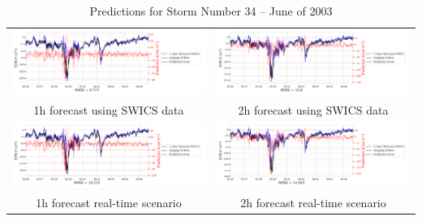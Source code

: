 \documentclass[draft,sw]{agutexSI2019}
\begin{document}
\begin{table}
\centering
\begin{tabular}{cc}
\includegraphics[width=0.49\linewidth]{paper_plots_shade/1h_swics/1h_swics_storm_34.png}
&
\includegraphics[width=0.49\linewidth]{paper_plots_shade/2h_swics/2h_swics_storm_34.png}
\\
1h forecast using SWICS data & 2h forecast using SWICS data
\vspace*{12pt}
\\
\includegraphics[width=0.49\linewidth]{paper_plots_shade/1h_rt/1h_rt_storm_34.png}
&
\includegraphics[width=0.49\linewidth]{paper_plots_shade/2h_rt/2h_rt_storm_34.png}
\\
1h forecast real-time scenario & 2h forecast real-time scenario 
\vspace*{12pt}
\\
\end{tabular}
\caption{Predictions for Storm Number 34 -- June of 2003}
\label{storm-34}
\end{table}
\end{document}

